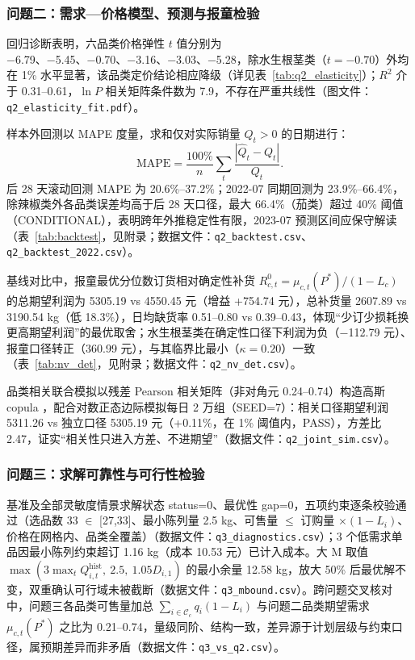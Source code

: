 \subsubsection{问题二：需求—价格模型、预测与报童检验}

回归诊断表明，六品类价格弹性 $t$ 值分别为 −6.79、−5.45、−0.70、−3.16、−3.03、−5.28，除水生根茎类（$t=-0.70$）外均在 1\% 水平显著，该品类定价结论相应降级（详见表~\ref{tab:q2_elasticity}）；$R^2$ 介于 0.31--0.61，$\ln P$ 相关矩阵条件数为 7.9，不存在严重共线性（图文件：\texttt{q2\_elasticity\_fit.pdf}）。

样本外回测以 MAPE 度量，求和仅对实际销量 $Q_t>0$ 的日期进行：
\begin{equation}
\mathrm{MAPE}=\frac{100\%}{n}\sum_{t}\frac{\left|\hat Q_t-Q_t\right|}{Q_t}.
\end{equation}
后 28 天滚动回测 MAPE 为 20.6\%--37.2\%；2022-07 同期回测为 23.9\%--66.4\%，除辣椒类外各品类误差均高于后 28 天口径，最大 66.4\%（茄类）超过 40\% 阈值（CONDITIONAL），表明跨年外推稳定性有限，2023-07 预测区间应保守解读（表~\ref{tab:backtest}，见附录；数据文件：\texttt{q2\_backtest.csv}、\texttt{q2\_backtest\_2022.csv}）。

基线对比中，报童最优分位数订货相对确定性补货 $R^0_{c,t}=\mu_{c,t}(P^*)/(1-L_c)$ 的总期望利润为 5305.19 vs 4550.45 元（增益 +754.74 元），总补货量 2607.89 vs 3190.54 kg（低 18.3\%），日均缺货率 0.51--0.80 vs 0.39--0.43，体现“少订少损耗换更高期望利润”的最优取舍；水生根茎类在确定性口径下利润为负（−112.79 元）、报童口径转正（360.99 元），与其临界比最小（$\kappa=0.20$）一致（表~\ref{tab:nv_det}，见附录；数据文件：\texttt{q2\_nv\_det.csv}）\cite{han2026}。

品类相关联合模拟以残差 Pearson 相关矩阵（非对角元 0.24--0.74）构造高斯 copula \cite{nelsen2006}，配合对数正态边际模拟每日 2 万组（SEED=7）：相关口径期望利润 5311.26 vs 独立口径 5305.19 元（+0.11\%，在 1\% 阈值内，PASS），方差比 2.47，证实“相关性只进入方差、不进期望”（数据文件：\texttt{q2\_joint\_sim.csv}）。

\subsubsection{问题三：求解可靠性与可行性检验}

基准及全部灵敏度情景求解状态 status=0、最优性 gap=0，五项约束逐条校验通过（选品数 33 $\in$ [27,33]、最小陈列量 2.5 kg、可售量 $\le$ 订购量 $\times(1-L_i)$、价格在网格内、品类全覆盖）（数据文件：\texttt{q3\_diagnostics.csv}）；3 个低需求单品因最小陈列约束超订 1.16 kg（成本 10.53 元）已计入成本。大 M 取值 $\max(3\max_t Q_{i,t}^{\mathrm{hist}},\ 2.5,\ 1.05D_{i,1})$ 的最小余量 12.58 kg，放大 50\% 后最优解不变，双重确认可行域未被截断（数据文件：\texttt{q3\_mbound.csv}）。跨问题交叉核对中，问题三各品类可售量加总 $\sum_{i\in\mathcal{C}_c}q_i(1-L_i)$ 与问题二品类期望需求 $\mu_{c,t}(P^*)$ 之比为 0.21--0.74，量级同阶、结构一致，差异源于计划层级与约束口径，属预期差异而非矛盾（数据文件：\texttt{q3\_vs\_q2.csv}）。

